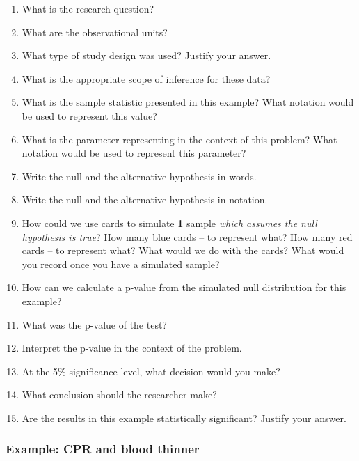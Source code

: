 \documentclass[
]{report}
\newcommand{\rgs}{\vspace{12pt}} %
\begin{document}
\begin{enumerate}
\def\labelenumi{\arabic{enumi}.}
\item
  What is the research question?
  \rgs
\item
  What are the observational units?
  \rgs
\item
  What type of study design was used? Justify your answer.
  \rgs
\item
  What is the appropriate scope of inference for these data?
  \rgs
\item
  What is the sample statistic presented in this example? What notation would be used to represent this value?
  \rgs
\item
  What is the parameter representing in the context of this problem? What notation would be used to represent this parameter?
  \rgs
  \rgs
\item
  Write the null and the alternative hypothesis in words.
  \rgs
  \rgs
\item
  Write the null and the alternative hypothesis in notation.
  \rgs
\item
  How could we use cards to simulate \textbf{1} sample \emph{which assumes the null hypothesis is true}? How many blue cards -- to represent what? How many red cards -- to represent what? What would we do with the cards? What would you record once you have a simulated sample?
  \rgs
  \rgs
\item
  How can we calculate a p-value from the simulated null distribution for this example?
  \rgs
  \rgs
\item
  What was the p-value of the test?
  \rgs
\item
  Interpret the p-value in the context of the problem.
  \rgs
  \rgs
\item
  At the 5\% significance level, what decision would you make?
  \rgs
\item
  What conclusion should the researcher make?
  \rgs
\item
  Are the results in this example statistically significant? Justify your answer.
  \rgs
\end{enumerate}

\hypertarget{example-cpr-and-blood-thinner}{%
\subsubsection*{Example: CPR and blood thinner}\label{example-cpr-and-blood-thinner}}
\end{document}
